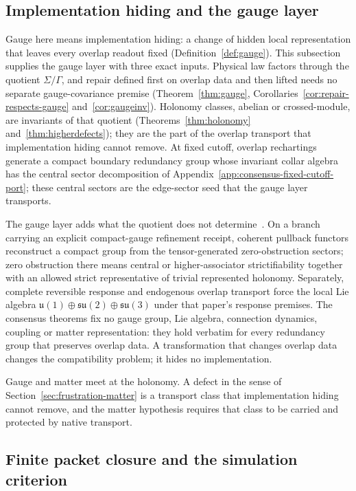 \documentclass[11pt]{article}
\theoremstyle{remark}
\theoremstyle{plain}
\begin{document}
\subsection{Implementation hiding and the gauge layer}
\label{sec:gauge-layer-bridge}

Gauge here means implementation hiding: a change of hidden local
representation that leaves every overlap readout fixed
(Definition~\ref{def:gauge}). This subsection supplies the gauge layer with
three exact inputs. Physical law factors through the quotient
\(\Sigma/\Gamma\), and repair defined first on overlap data and then lifted
needs no separate gauge-covariance premise
(Theorem~\ref{thm:gauge}, Corollaries~\ref{cor:repair-respects-gauge}
and~\ref{cor:gaugeinv}). Holonomy classes, abelian or crossed-module, are
invariants of that quotient (Theorems~\ref{thm:holonomy}
and~\ref{thm:higherdefects}); they are the part of the overlap transport
that implementation hiding cannot remove. At fixed cutoff, overlap
rechartings generate a compact boundary redundancy group whose invariant
collar algebra has the central sector decomposition of
Appendix~\ref{app:consensus-fixed-cutoff-port}; these central sectors are
the edge-sector seed that the gauge layer transports.

The gauge layer adds what the quotient does not
determine~\cite{ophGauge}. On a branch carrying an explicit compact-gauge
refinement receipt, coherent pullback functors reconstruct a compact group
from the tensor-generated zero-obstruction sectors; zero obstruction there
means central or higher-associator strictifiability together with an
allowed strict representative of trivial represented holonomy. Separately,
complete reversible response and endogenous overlap transport force the
local Lie algebra \(\mathfrak u(1)\oplus\mathfrak{su}(2)\oplus
\mathfrak{su}(3)\) under that paper's response premises. The consensus
theorems fix no gauge group, Lie algebra, connection dynamics, coupling or
matter representation: they hold verbatim for every redundancy
group that preserves overlap data. A transformation that changes overlap
data changes the compatibility problem; it hides no implementation.

Gauge and matter meet at the holonomy. A defect in the sense of
Section~\ref{sec:frustration-matter} is a transport class that
implementation hiding cannot remove, and the matter hypothesis requires
that class to be carried and protected by native transport.

\subsection{Finite packet closure and the simulation criterion}
\end{document}
